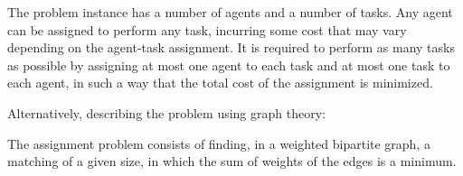 \documentclass[12pt, a4paper]{memoir}
\begin{document}
\begin{enumerate}[leftmargin=*]
\begin{shaded}
        The problem instance has a number of agents and a number of tasks. Any agent can be assigned to perform any task, incurring some cost that may vary depending on the agent-task assignment. It is required to perform as many tasks as possible by assigning at most one agent to each task and at most one task to each agent, in such a way that the total cost of the assignment is minimized.
    \end{shaded}
    Alternatively, describing the problem using graph theory: 
    \begin{shaded}
        The assignment problem consists of finding, in a weighted bipartite graph, a matching of a given size, in which the sum of weights of the edges is a minimum.
    \end{shaded}
    
    
\end{enumerate}
\end{document}
